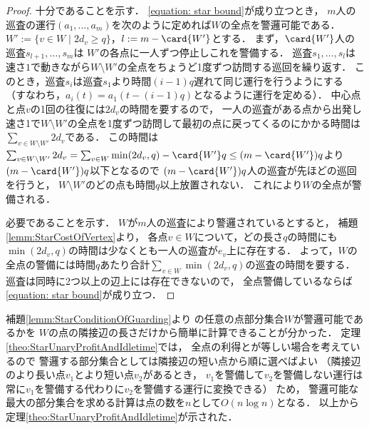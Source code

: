 \begin{proof}
  十分であることを示す．
  \eqref{equation: star bound}が成り立つとき，
  $m$人の巡査の運行$(a_1, \ldots, a_m)$を次のように定めれば$W$の全点を警邏可能である．
  $W' := \{ v \in W \mid 2d_v \geq q \}$，$l := m - \card{W'}$とする．
  まず，$\card{W'}$人の巡査$s_{l + 1}, \ldots, s_m$は
  $W'$の各点に一人ずつ停止しこれを警備する．
  巡査$s_1, \ldots, s_l$は
  速さ$1$で動きながら$W \setminus W'$の全点をちょうど1度ずつ訪問する巡回を繰り返す．
  このとき，巡査$s_i$は巡査$s_1$より時間$(i - 1)q$遅れて同じ運行を行うようにする
  （すなわち，$a_i(t) = a_1(t - (i - 1)q)$となるように運行を定める）．
  中心点と点$v$の1回の往復には$2d_v$の時間を要するので，
  一人の巡査がある点から出発し速さ1で$W \setminus W'$の全点を1度ずつ訪問して最初の点に戻ってくるのにかかる時間は$\sum_{v \in W \setminus W'} 2d_v$である．
  この時間は
  $\sum_{v \in W \setminus W'} 2d_v
    = \sum_{v \in W} \min(2d_v, q) - \card{W'}q
    \leq (m - \card{W'})q$より$(m - \card{W'})q$以下となるので
  $(m - \card{W'})q$人の巡査が先ほどの巡回を行うと，
  $W \setminus W'$のどの点も時間$q$以上放置されない．
  これにより$W$の全点が警備される．

  必要であることを示す．
  $W$が$m$人の巡査により警邏されているとすると，
  補題\ref{lemm:StarCostOfVertex}より，
  各点$v \in W$について，どの長さ$q$の時間にも
  $\min(2d_v, q)$の時間は少なくとも一人の巡査が$e_v$上に存在する．
  よって，$W$の全点の警備には時間$q$あたり合計$\sum_{v \in W} \min(2d_v, q)$の巡査の時間を要する．
  巡査は同時に2つ以上の辺上には存在できないので，
  全点警備しているならば\eqref{equation: star bound}が成り立つ．
\end{proof}


補題\ref{lemm:StarConditionOfGuarding}より
{\graphStar}の任意の点部分集合$W$が警邏可能であるかを
$W$の点の隣接辺の長さだけから簡単に計算できることが分かった．
定理\ref{theo:StarUnaryProfitAndIdletime}では，
全点の利得と{\maxIdletime}が等しい場合を考えているので
警邏する部分集合としては隣接辺の短い点から順に選べばよい
（隣接辺のより長い点$v_1$とより短い点$v_2$があるとき，
$v_1$を警備して$v_2$を警備しない運行は常に$v_1$を警備する代わりに$v_2$を警備する運行に変換できる）
ため，
警邏可能な最大の部分集合を求める計算は点の数を$n$として$O(n \log n)$となる．
以上から定理\ref{theo:StarUnaryProfitAndIdletime}が示された．
